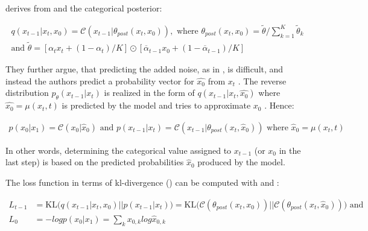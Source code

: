 \textcite{hoogeboom2021ArgmaxFlowsMultinomial} derives from  and  the categorical posterior:

\begin{equation}
  \begin{gathered}
  \label{eqn:mul_diff3}
  q(x_{t-1}|x_t, x_{0}) = \mathcal{C}(x_{t-1}|\theta_{post}(x_t,x_0)),\textrm{ where } \theta_{post}(x_t,x_0)=\tilde{\theta}/\sum_{k=1}^{K}\tilde{\theta}_k \\
  \textrm{and } \tilde{\theta} = \left[\alpha_tx_{t}+(1-\alpha_t)/K \right] \odot \left[\overline{\alpha}_{t-1}x_{0}+(1-\overline{\alpha}_{t-1})/K \right]
  \end{gathered}
\end{equation}

They further argue, that predicting the added noise, as in \cite{ho2020DenoisingDiffusionProbabilistic},
is difficult, and instead the authors predict a probability vector for $\hat{x_0}$ from $x_t$ \cite{hoogeboom2021ArgmaxFlowsMultinomial}.
The reverse distribution $p_\theta(x_{t-1}|x_t)$ is realized in the form of $q(x_{t-1}|x_t,\hat{x_0})$ where $\hat{x_0}=\mu(x_t, t)$ is predicted by the model and tries to approximate $x_0$ \cite{hoogeboom2021ArgmaxFlowsMultinomial}.
Hence:

\begin{equation}
  \begin{align*}
    \label{eqn:mul_diff4}
    p(x_0|x_1) = \mathcal{C}(x_0|\hat{x}_0) \textrm{ and } p(x_{t-1}|x_t) =  \mathcal{C}(x_{t-1}|\theta_{post}(x_t, \hat{x}_0)) \textrm{ where } \hat{x}_0=\mu(x_t,t)
  \end{align*}
\end{equation}

In other words, determining the categorical value assigned to $x_{t-1}$ (or $x_0$ in the last step) is based on the predicted probabilities $\hat{x}_0$ produced by the model.


The loss function in terms of \gls{kl}-divergence () can be computed with  and :

\begin{equation}
  \begin{align*}
    \label{eqn:mul_diff5}
    L_{t-1}&=\text{KL}\Big(q(x_{t-1}|x_t, x_0)\big\vert\big\vert p(x_{t-1}|x_t)\Big) = \text{KL}\Big(\mathcal{C}(\theta_{post}(x_t, x_0))\big\vert\big\vert \mathcal{C}(\theta_{post}(x_t, \hat{x}_0))\Big) \textrm{ and}\\
    L_{0} &= -logp(x_0|x_1) = \sum_{k}^{}x_{0,k}log\hat{x}_{0,k}
  \end{align*}
\end{equation}

